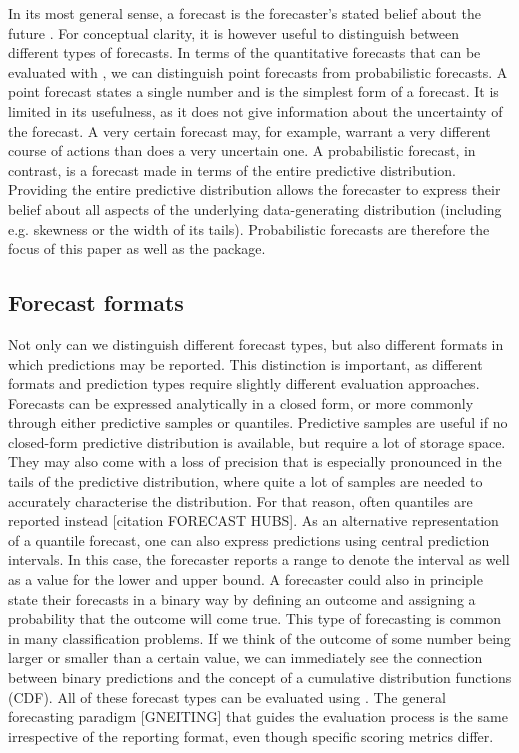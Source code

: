\documentclass[article]{jss}
\begin{document}
In its most general sense, a forecast is the forecaster’s stated belief about the future \citep{gneitingStrictlyProperScoring2007}. For conceptual clarity, it is however useful to distinguish between different types of forecasts. In terms of the quantitative forecasts that can be evaluated with , we can distinguish point forecasts from probabilistic forecasts. A point forecast states a single number and is the simplest form of a forecast. It is limited in its usefulness, as it does not give information about the uncertainty of the forecast. A very certain forecast may, for example, warrant a very different course of actions than does a very uncertain one. A probabilistic forecast, in contrast, is a forecast made in terms of the entire predictive distribution. Providing the entire predictive distribution allows the forecaster to express their belief about all aspects of the underlying data-generating distribution (including e.g. skewness or the width of its tails). Probabilistic forecasts are therefore the focus of this paper as well as the  package. 

\subsection{Forecast formats}

Not only can we distinguish different forecast types, but also different formats in which predictions may be reported. This distinction is important, as different formats and prediction types require slightly different evaluation approaches. Forecasts can be expressed analytically in a closed form, or more commonly through either predictive samples or quantiles. Predictive samples are useful if no closed-form predictive distribution is available, but require a lot of storage space. They may also come with a loss of precision that is especially pronounced in the tails of the predictive distribution, where quite a lot of samples are needed to accurately characterise the distribution. For that reason, often quantiles are reported instead [citation FORECAST HUBS]. As an alternative representation of a quantile forecast, one can also express predictions using central prediction intervals. In this case, the forecaster reports a range to denote the interval as well as a value for the lower and upper bound. A forecaster could also in principle state their forecasts in a binary way by defining an outcome and assigning a probability that the outcome will come true. This type of forecasting is common in many classification problems. If we think of the outcome of some number being larger or smaller than a certain value, we can immediately see the connection between binary predictions and the concept of a cumulative distribution functions (CDF). All of these forecast types can be evaluated using . The general forecasting paradigm [GNEITING] that guides the evaluation process is the same irrespective of the reporting format, even though specific scoring metrics differ. 
\end{document}
